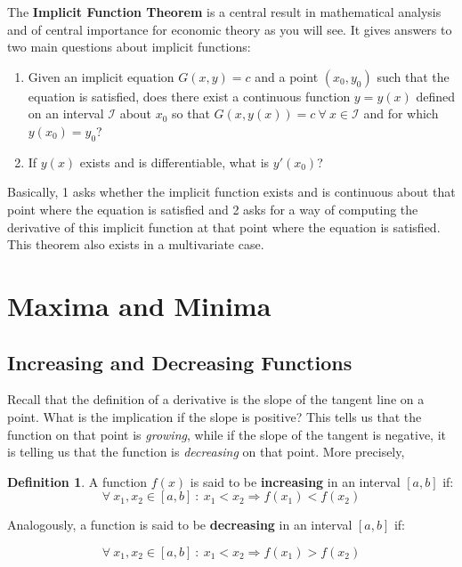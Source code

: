 \documentclass[a4paper,11pt]{article}
\theoremstyle{definition}
\newtheorem{definition}{Definition}
\theoremstyle{plain}
\begin{document}
The \textbf{Implicit Function Theorem} is a central result in
mathematical analysis and of central importance for economic theory as
you will see. It gives answers to two main questions about implicit
functions:

\begin{enumerate}
\def\labelenumi{\arabic{enumi}.}
\item
  Given an implicit equation \(G(x,y) = c\) and a point \((x_0, y_0)\)
  such that the equation is satisfied, does there exist a continuous
  function \(y = y(x)\) defined on an interval \(\mathcal{I}\) about
  \(x_0\) so that
  \(G\left(x, y(x)\right) = c \ \forall \ x\in\mathcal{I}\) and for
  which \(y(x_0) = y_0\)?
\item
  If \(y(x)\) exists and is differentiable, what is \(y'(x_0)\)?
\end{enumerate}

Basically, 1 asks whether the implicit function exists and is continuous
about that point where the equation is satisfied and 2 asks for a way of
computing the derivative of this implicit function at that point where
the equation is satisfied. This theorem also exists in a multivariate
case.

\section{Maxima and Minima}\label{maxima-and-minima}

\subsection{Increasing and Decreasing
Functions}\label{increasing-and-decreasing-functions}

Recall that the definition of a derivative is the slope of the tangent
line on a point. What is the implication if the slope is positive? This
tells us that the function on that point is \emph{growing}, while if the
slope of the tangent is negative, it is telling us that the function is
\emph{decreasing} on that point. More precisely,

\begin{definition}
A function \(f(x)\) is said to be
\textbf{increasing} in an interval \([a,b]\) if: \[
\forall \ x_1,x_2\in[a,b] \ : \ x_1 < x_2 \Rightarrow f(x_1) < f(x_2)
\]

Analogously, a function is said to be \textbf{decreasing} in an interval
\([a,b]\) if:

\[
\forall \ x_1,x_2\in[a,b] \ : \ x_1 < x_2 \Rightarrow f(x_1) > f(x_2)
\]
\end{definition}
\end{document}
